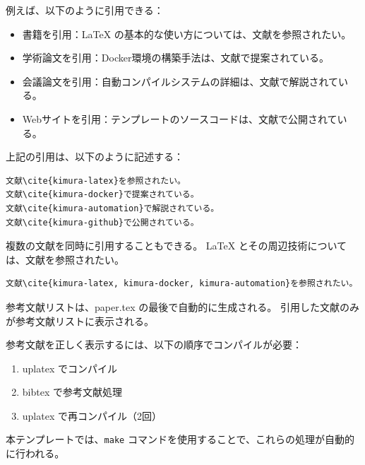 
例えば、以下のように引用できる：

\begin{itemize}
  \item 書籍を引用：LaTeX の基本的な使い方については、文献\cite{kimura-latex}を参照されたい。
  \item 学術論文を引用：Docker環境の構築手法は、文献\cite{kimura-docker}で提案されている。
  \item 会議論文を引用：自動コンパイルシステムの詳細は、文献\cite{kimura-automation}で解説されている。
  \item Webサイトを引用：テンプレートのソースコードは、文献\cite{kimura-github}で公開されている。
\end{itemize}

上記の引用は、以下のように記述する：

\begin{verbatim}
文献\cite{kimura-latex}を参照されたい。
文献\cite{kimura-docker}で提案されている。
文献\cite{kimura-automation}で解説されている。
文献\cite{kimura-github}で公開されている。
\end{verbatim}


複数の文献を同時に引用することもできる。
LaTeX とその周辺技術については、文献\cite{kimura-latex, kimura-docker, kimura-automation}を参照されたい。

\begin{verbatim}
文献\cite{kimura-latex, kimura-docker, kimura-automation}を参照されたい。
\end{verbatim}


参考文献リストは、paper.tex の最後で自動的に生成される。
引用した文献のみが参考文献リストに表示される。


参考文献を正しく表示するには、以下の順序でコンパイルが必要：

\begin{enumerate}
  \item uplatex でコンパイル
  \item bibtex で参考文献処理
  \item uplatex で再コンパイル（2回）
\end{enumerate}

本テンプレートでは、\verb|make| コマンドを使用することで、これらの処理が自動的に行われる。
\fi